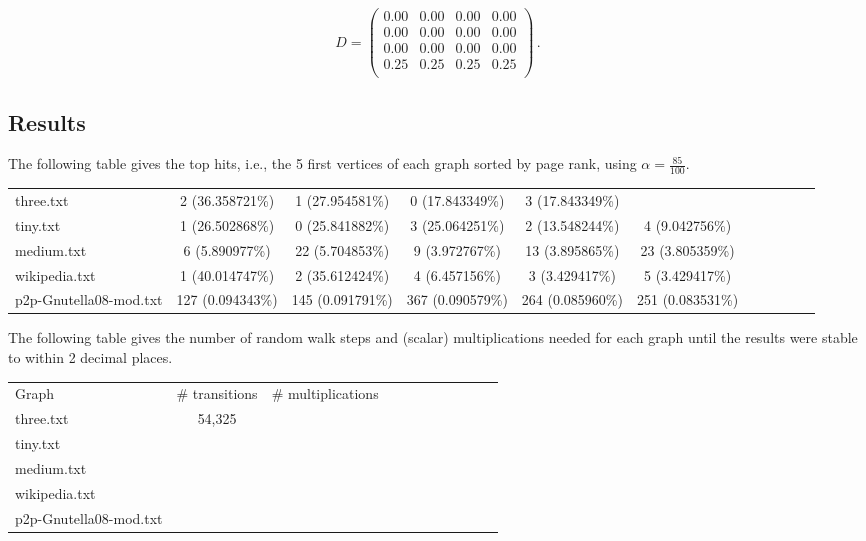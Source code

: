 \documentclass{tufte-handout}
\begin{document}
\begin{equation*}
D =
\left(
\begin{array}{cccc}
0.00 & 0.00 & 0.00 & 0.00 \\
0.00 & 0.00 & 0.00 & 0.00 \\
0.00 & 0.00 & 0.00 & 0.00 \\
0.25 & 0.25 & 0.25 & 0.25 \\
\end{array}
\right)\,.
\end{equation*}

\subsection{Results}

The following table gives the top hits, i.e., the 5 first vertices of
each graph sorted by page rank, using $\alpha = \frac{85}{100}$.



\medskip
\begin{fullwidth}
\small
\begin{tabular}{lcccccccccc}
three.txt & 2 (36.358721\%) & 1 (27.954581\%) & 0 (17.843349\%) & 3 (17.843349\%) \\
tiny.txt &  1 (26.502868\%) & 0 (25.841882\%) & 3 (25.064251\%) & 2 (13.548244\%) & 4 (9.042756\%) \\
medium.txt & 6 (5.890977\%)  & 22 (5.704853\%)  & 9 (3.972767\%) & 13 (3.895865\%) & 23 (3.805359\%) \\
wikipedia.txt & 1 (40.014747\%)  &2 (35.612424\%)  &4 (6.457156\%)  &3 (3.429417\%)  &5 (3.429417\%)  \\
p2p-Gnutella08-mod.txt & 127 (0.094343\%)  &145 (0.091791\%)  &367 (0.090579\%)  &264 (0.085960\%)  &251 (0.083531\%)
\end{tabular}
\end{fullwidth}

\bigskip The following table gives the number of random walk steps and
(scalar) multiplications needed for each graph until the results were
stable to within 2 decimal places.

\medskip
\begin{fullwidth}
\small
\begin{tabular}{lcccccccccc}
Graph & \# transitions  & \# multiplications \\
three.txt & 54,325 \\
tiny.txt &\\
medium.txt &\\
wikipedia.txt & \\
p2p-Gnutella08-mod.txt
\end{tabular}
\end{fullwidth}
\end{document}
